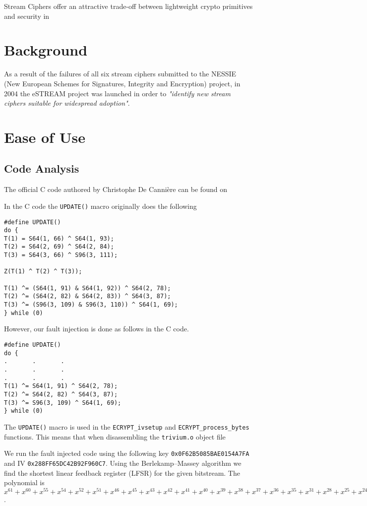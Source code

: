 \documentclass[conference]{IEEEtran}
\newcommand{\code}[1]{\texttt{#1}}
\begin{document}
Stream Ciphers offer an attractive trade-off between lightweight crypto primitives and security in 

\section{Background}

As a result of the failures of all six stream ciphers submitted to the NESSIE (New European Schemes for Signatures, Integrity and Encryption) project, in 2004 the eSTREAM project was launched in order to \textit{"identify new stream ciphers suitable for widespread adoption"}\cite{call}.



\section{Ease of Use}

\subsection{Code Analysis}
The official C code authored by Christophe De Canni\`ere can be found on  

In the C code the \code{UPDATE()} macro originally does the following
\begin{lstlisting}[style=snippet]
#define UPDATE()
do { 
T(1) = S64(1, 66) ^ S64(1, 93);
T(2) = S64(2, 69) ^ S64(2, 84);
T(3) = S64(3, 66) ^ S96(3, 111);

Z(T(1) ^ T(2) ^ T(3));

T(1) ^= (S64(1, 91) & S64(1, 92)) ^ S64(2, 78); 
T(2) ^= (S64(2, 82) & S64(2, 83)) ^ S64(3, 87); 
T(3) ^= (S96(3, 109) & S96(3, 110)) ^ S64(1, 69); 
} while (0)
\end{lstlisting}
However, our fault injection is done as follows in the C code.
\begin{lstlisting}[style=snippet]
#define UPDATE()
do {
.       .       .
.       .       .
.       .       .
T(1) ^= S64(1, 91) ^ S64(2, 78); 
T(2) ^= S64(2, 82) ^ S64(3, 87); 
T(3) ^= S96(3, 109) ^ S64(1, 69); 
} while (0)
\end{lstlisting}

The \code{UPDATE()} macro is used in the \code{ECRYPT\_ivsetup} and \code{ECRYPT\_process\_bytes} functions. This means that when disassembling the \code{trivium.o} object file 

We run the fault injected code using the following key \code{0x0F62B5085BAE0154A7FA} and IV \code{0x288FF65DC42B92F960C7}. Using the Berlekamp–Massey algorithm \cite{massey} we find the shortest linear feedback register (LFSR) for the given bitstream. The polynomial is
$x^{61} + x^{60} + x^{55} + x^{54} + x^{52} + x^{51} + x^{46} + x^{45} + x^{43} + x^{42} + x^{41} + x^{40} + x^{39} + x^{38} + x^{37} + x^{36} + x^{35} + x^{31} + x^{28} + x^{25} + x^{24} + x^{23} + x^{20} + x^{19} + x^{18} + x^{11} + x^8 + x^7 + 1$.
\end{document}
